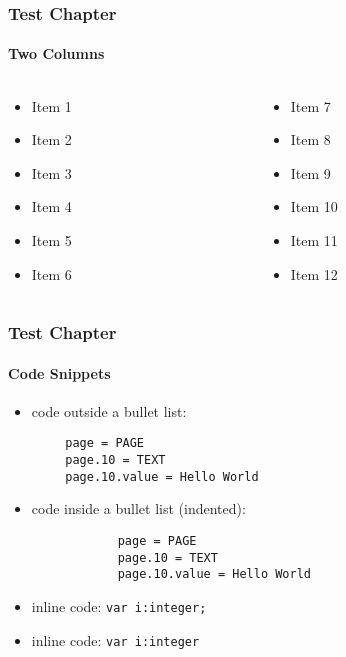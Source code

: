 \begin{frame}
	\frametitle{Test Chapter}
	\framesubtitle{Two Columns}

	\begin{columns}[T]

		\begin{column}{.5\textwidth}
			\begin{itemize}
				\item Item 1
				\item Item 2
				\item Item 3
				\item Item 4
				\item Item 5
				\item Item 6
			\end{itemize}
		\end{column}

		\begin{column}{.5\textwidth}
			\begin{itemize}
				\item Item 7
				\item Item 8
				\item Item 9
				\item Item 10
				\item Item 11
				\item Item 12
			\end{itemize}
		\end{column}

	\end{columns}

\end{frame}


\begin{frame}[fragile]
	\frametitle{Test Chapter}
	\framesubtitle{Code Snippets}

	\begin{itemize}
		\item code outside a bullet list:
	\end{itemize}

	\begin{lstlisting}
		page = PAGE
		page.10 = TEXT
		page.10.value = Hello World
	\end{lstlisting}

	\begin{itemize}
		\item code inside a bullet list (indented):
		\begin{lstlisting}
			page = PAGE
			page.10 = TEXT
			page.10.value = Hello World
		\end{lstlisting}
	\end{itemize}

	\begin{itemize}
		\item inline code: \lstinline!var i:integer;!
		\item inline code: \texttt{var i:integer}
	\end{itemize}

\end{frame}

